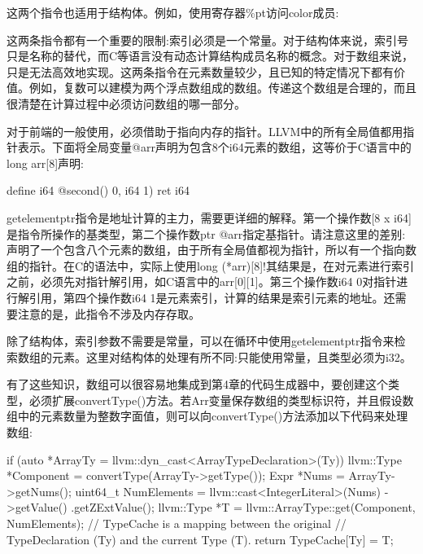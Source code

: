 这两个指令也适用于结构体。例如，使用寄存器\%pt访问color成员:

\begin{shell}
\end{shell}

这两条指令都有一个重要的限制:索引必须是一个常量。对于结构体来说，索引号只是名称的替代，而C等语言没有动态计算结构成员名称的概念。对于数组来说，只是无法高效地实现。这两条指令在元素数量较少，且已知的特定情况下都有价值。例如，复数可以建模为两个浮点数组成的数组。传递这个数组是合理的，而且很清楚在计算过程中必须访问数组的哪一部分。

对于前端的一般使用，必须借助于指向内存的指针。LLVM中的所有全局值都用指针表示。下面将全局变量@arr声明为包含8个i64元素的数组，这等价于C语言中的long arr[8]声明:

\begin{shell}
define i64 @second() {
    0, i64 1)
    ret i64 %
}
\end{shell}

getelementptr指令是地址计算的主力，需要更详细的解释。第一个操作数[8 x i64]是指令所操作的基类型，第二个操作数ptr @arr指定基指针。请注意这里的差别:声明了一个包含八个元素的数组，由于所有全局值都视为指针，所以有一个指向数组的指针。在C的语法中，实际上使用long (*arr)[8]!其结果是，在对元素进行索引之前，必须先对指针解引用，如C语言中的arr[0][1]。第三个操作数i64 0对指针进行解引用，第四个操作数i64 1是元素索引，计算的结果是索引元素的地址。还需要注意的是，此指令不涉及内存存取。

除了结构体，索引参数不需要是常量，可以在循环中使用getelementptr指令来检索数组的元素。这里对结构体的处理有所不同:只能使用常量，且类型必须为i32。

有了这些知识，数组可以很容易地集成到第4章的代码生成器中，要创建这个类型，必须扩展convertType()方法。若Arr变量保存数组的类型标识符，并且假设数组中的元素数量为整数字面值，则可以向convertType()方法添加以下代码来处理数组:

\begin{cpp}
if (auto *ArrayTy =
            llvm::dyn_cast<ArrayTypeDeclaration>(Ty)) {
    llvm::Type *Component =
        convertType(ArrayTy->getType());
    Expr *Nums = ArrayTy->getNums();
    uint64_t NumElements =
        llvm::cast<IntegerLiteral>(Nums)
            ->getValue()
            .getZExtValue();
    llvm::Type *T =
        llvm::ArrayType::get(Component, NumElements);
    // TypeCache is a mapping between the original
    // TypeDeclaration (Ty) and the current Type (T).
    return TypeCache[Ty] = T;
}
\end{cpp}

